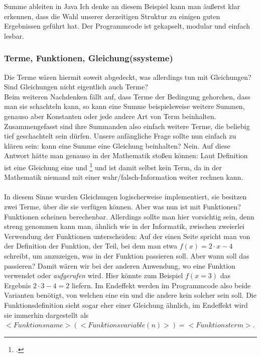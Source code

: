 				{Summe ableiten in Java}
\noindent
Ich denke an diesem Beispiel kann man äußerst klar erkennen, dass die Wahl unserer derzeitigen Struktur zu einigen guten Ergebnissen geführt hat. Der Programmcode ist gekapselt, modular und einfach lesbar.

\subsubsection{Terme, Funktionen, Gleichung(ssysteme)}
Die Terme wären hiermit soweit abgedeckt, was allerdings tun mit Gleichungen? Sind Gleichungen nicht eigentlich auch Terme?\\
Beim weiteren Nachdenken fällt auf, dass Terme der Bedingung gehorchen, dass man sie schachteln kann, so kann eine Summe beispielsweise weitere Summen, genauso aber Konstanten oder jede andere Art von Term beinhalten. Zusammengefasst sind ihre Summanden also einfach weitere Terme, die beliebig tief geschachtelt sein dürfen. Unsere anfängliche Frage sollte nun einfach zu klären sein: kann eine Summe eine Gleichung beinhalten? Nein. Auf diese Antwort hätte man genauso in der Mathematik stoßen können: Laut Definition ist eine Gleichung eine  und \footcite{math_gleichung} und ist damit selbst kein Term, da in der Mathematik niemand mit einer wahr/falsch-Information weiter rechnen kann.\\
\\
In diesem Sinne wurden Gleichungen logischerweise implementiert, sie besitzen zwei Terme, über die sie verfügen können. Aber was nun ist mit Funktionen? Funktionen scheinen berechenbar. Allerdings sollte man hier vorsichtig sein, denn streng genommen kann man, ähnlich wie in der Informatik, zwischen zweierlei Verwendung der Funktionen unterscheiden: Auf der einen Seite spricht man von der Definition der Funktion, der Teil, bei dem man etwa $f(x) = 2 \cdot x  - 4$ schreibt, um anzuzeigen, was in der Funktion passieren soll. Aber wann soll das passieren? Damit wären wir bei der anderen Anwendung, wo eine Funktion verwendet oder \textit{aufgerufen} wird. Hier könnte zum Beispiel $f(x=3)$ das Ergebnis $2 \cdot 3 - 4 = 2$ liefern. Im Endeffekt werden im Programmcode also beide Varianten benötigt, von welchen eine ein  und die andere kein solcher sein soll. Die Funktionsdefinition sieht sogar eher einer Gleichung ähnlich, im Endeffekt wird sie immerhin dargestellt als $<Funktionsname>(<Funktionsvariable(n)>)=<Funktionsterm>$.\\
